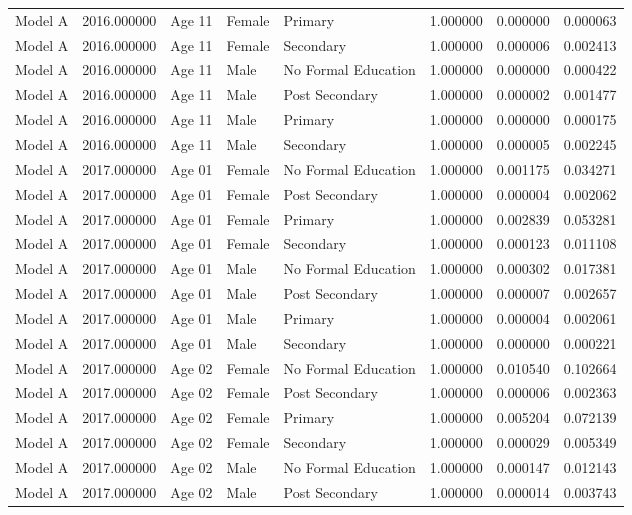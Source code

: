 \begin{table}[ht]
\begin{tabular}{lrlllrrr}
Model A & 2016.000000 & Age 11 & Female & Primary & 1.000000 & 0.000000 & 0.000063 \\
Model A & 2016.000000 & Age 11 & Female & Secondary & 1.000000 & 0.000006 & 0.002413 \\
Model A & 2016.000000 & Age 11 & Male & No Formal Education & 1.000000 & 0.000000 & 0.000422 \\
Model A & 2016.000000 & Age 11 & Male & Post Secondary & 1.000000 & 0.000002 & 0.001477 \\
Model A & 2016.000000 & Age 11 & Male & Primary & 1.000000 & 0.000000 & 0.000175 \\
Model A & 2016.000000 & Age 11 & Male & Secondary & 1.000000 & 0.000005 & 0.002245 \\
Model A & 2017.000000 & Age 01 & Female & No Formal Education & 1.000000 & 0.001175 & 0.034271 \\
Model A & 2017.000000 & Age 01 & Female & Post Secondary & 1.000000 & 0.000004 & 0.002062 \\
Model A & 2017.000000 & Age 01 & Female & Primary & 1.000000 & 0.002839 & 0.053281 \\
Model A & 2017.000000 & Age 01 & Female & Secondary & 1.000000 & 0.000123 & 0.011108 \\
Model A & 2017.000000 & Age 01 & Male & No Formal Education & 1.000000 & 0.000302 & 0.017381 \\
Model A & 2017.000000 & Age 01 & Male & Post Secondary & 1.000000 & 0.000007 & 0.002657 \\
Model A & 2017.000000 & Age 01 & Male & Primary & 1.000000 & 0.000004 & 0.002061 \\
Model A & 2017.000000 & Age 01 & Male & Secondary & 1.000000 & 0.000000 & 0.000221 \\
Model A & 2017.000000 & Age 02 & Female & No Formal Education & 1.000000 & 0.010540 & 0.102664 \\
Model A & 2017.000000 & Age 02 & Female & Post Secondary & 1.000000 & 0.000006 & 0.002363 \\
Model A & 2017.000000 & Age 02 & Female & Primary & 1.000000 & 0.005204 & 0.072139 \\
Model A & 2017.000000 & Age 02 & Female & Secondary & 1.000000 & 0.000029 & 0.005349 \\
Model A & 2017.000000 & Age 02 & Male & No Formal Education & 1.000000 & 0.000147 & 0.012143 \\
Model A & 2017.000000 & Age 02 & Male & Post Secondary & 1.000000 & 0.000014 & 0.003743 \\

\end{tabular}
\end{table}
